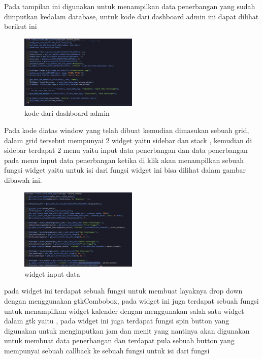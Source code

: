 \documentclass[a4paper,12pt]{article}
\begin{document}
\FloatBarrier
Pada tampilan ini digunakan untuk menampilkan data penerbangan yang sudah diinputkan kedalam database, untuk kode dari dashboard admin ini 
dapat dilihat berikut ini
\begin{figure}[!htbp]
    \centering
    \includegraphics[width=0.5\textwidth]{./img/dashboard_admin/kode_dahboard_admin.png}
    \caption{kode dari dashboard admin}
\end{figure}
\FloatBarrier
Pada kode diatas window yang telah dibuat kemudian dimasukan sebuah grid, dalam grid tersebut mempunyai 2 widget yaitu sidebar dan stack
, kemudian di sidebar terdapat 2 menu yaitu input data penerbangan dan data penerbangan 
pada menu input data penerbangan ketika di klik akan menampilkan sebuah fungsi widget yaitu \texttt{} untuk isi dari
fungsi widget ini bisa dilihat dalam gambar dibawah ini.
\begin{figure}[!htbp]
    \centering
    \includegraphics[width=0.5\textwidth]{./img/dashboard_admin/input_data_widget.png}
    \caption{widget input data}
\end{figure}
\FloatBarrier
pada widget ini terdapat sebuah fungsi untuk membuat layaknya drop down dengan menggunakan gtkCombobox,
pada widget ini juga terdapat sebuah fungsi untuk menampilkan widget kalender dengan menggunakan salah satu widget dalam gtk yaitu  \texttt{},
pada widget ini juga terdapat fungsi spin button yang digunakan untuk menginputkan jam dan menit yang nantinya akan digunakan untuk membuat data penerbangan
dan terdapat pula sebuah button yang mempunyai sebuah callback ke sebuah fungsi  \texttt{} untuk isi dari fungsi 
\end{document}

